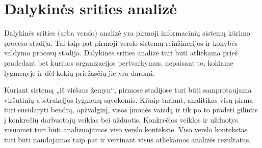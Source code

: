 \section{Dalykinės srities analizė}


Dalykinės srities (arba verslo) analizė yra pirmoji informacinių sistemų
kūrimo proceso stadija. Tai taip pat pirmoji verslo sistemų reinžinerijos
ir kokybės valdymo procesų stadija. Dalykinės srities analizė turi
būti atliekama prieš pradedant bet kuriuos organizacijos pertvarkymus,
nepaisant to, kokiame lygmenyje ir dėl kokių priežasčių jie yra daromi.

Kuriant sistemą „iš viršaus žemyn“, pirmose stadijose turi būti 
samprotaujama viršutinių abstrakcijos lygmenų sąvokomis. Kitaip tariant,
analitikas visų pirma turi susidaryti bendrą, apžvalginį, visos įmonės
vaizdą ir tik po to pradėti gilintis į konkrečių darbuotojų veiklas
bei užduotis. Konkrečios veiklos ir užduotys visuomet turi būti
analizuojamos viso verslo kontekste. Viso verslo kontekstas turi būti
naudojamas taip pat ir vertinant visus atliekamos analizės rezultatus.

